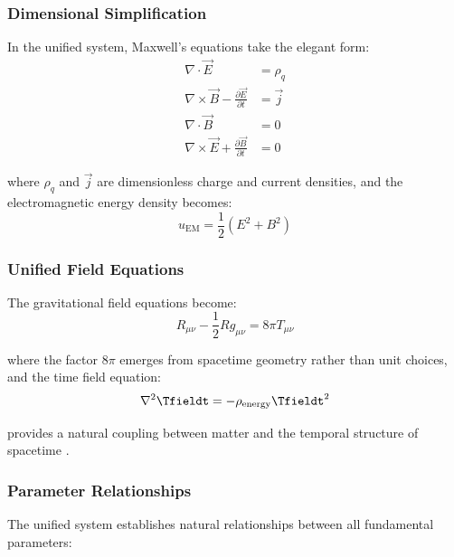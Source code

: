 	\subsubsection{Dimensional Simplification}
	\label{subsubsec:dimensional_simplification}
	
	In the unified system, Maxwell's equations take the elegant form:
	\begin{align}
		\nabla \cdot \vec{E} &= \rho_q \\
		\nabla \times \vec{B} - \frac{\partial \vec{E}}{\partial t} &= \vec{j} \\
		\nabla \cdot \vec{B} &= 0 \\
		\nabla \times \vec{E} + \frac{\partial \vec{B}}{\partial t} &= 0
	\end{align}
	
	where $\rho_q$ and $\vec{j}$ are dimensionless charge and current densities, and the electromagnetic energy density becomes:
	\begin{equation}
		u_{\text{EM}} = \frac{1}{2}(E^2 + B^2)
	\end{equation}
	
	\subsubsection{Unified Field Equations}
	\label{subsubsec:unified_field_equations}
	
	The gravitational field equations become:
	\begin{equation}
		R_{\mu\nu} - \frac{1}{2}Rg_{\mu\nu} = 8\pi T_{\mu\nu}
	\end{equation}
	
	where the factor $8\pi$ emerges from spacetime geometry rather than unit choices, and the time field equation:
	\begin{equation}
		\nabla^2 \Tfieldt = -\rho_{\text{energy}} \Tfieldt^2
	\end{equation}
	
	provides a natural coupling between matter and the temporal structure of spacetime \cite{pascher_lagrangian_2025}.
	
	\subsubsection{Parameter Relationships}
	\label{subsubsec:parameter_relationships}
	
	The unified system establishes natural relationships between all fundamental parameters:
	
